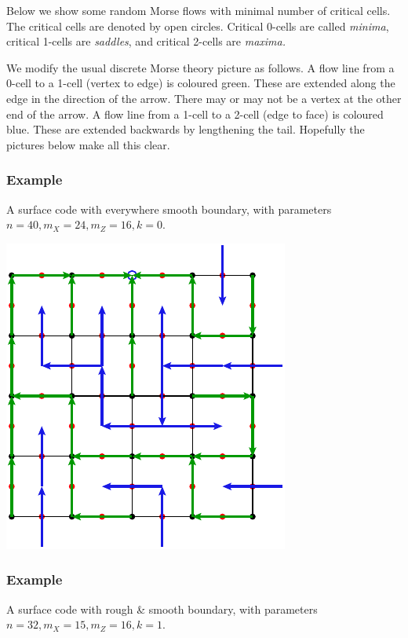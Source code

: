 \documentclass[11pt,oneside]{article}
\begin{document}
Below we show some random Morse flows with minimal number of 
critical cells.
The critical cells are denoted by open circles.
Critical 0-cells are called {\it minima}, critical
1-cells are {\it saddles}, and critical 2-cells are {\it maxima.}

We modify the usual discrete Morse theory picture as follows.
A flow line from a 0-cell to a 1-cell (vertex to edge)
is coloured green. These are extended along the edge in the
direction of the arrow. There may or may not be a vertex at the other
end of the arrow.
A flow line from a 1-cell to a 2-cell (edge to face)
is coloured blue. These are extended backwards by lengthening
the tail.
Hopefully the pictures below make all this clear.

\subsubsection{Example}

A surface code with everywhere smooth boundary,
with parameters $n=40, m_X=24, m_Z=16, k=0.$

\begin{center}
\includegraphics[]{pic-disc.pdf}
\end{center}


\subsubsection{Example}

A surface code with rough \& smooth boundary,
with parameters $n=32, m_X=15, m_Z=16, k=1.$
\end{document}
